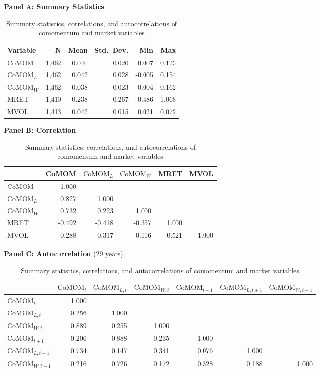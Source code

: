 \begin{table}[htbp]
\centering
\caption{Summary statistics, correlations, and autocorrelations of comomentum and market variables}
\label{tab:summary_statistics}
\small

\textbf{Panel A: Summary Statistics}\\[4pt]
\begin{tabular}{l r r r r r}
\toprule
    Variable & N & Mean & Std.\ Dev. & Min & Max \\
\midrule
    CoMOM & 1,462 & 0.040 & 0.020 & 0.007 & 0.123 \\
    $\text{CoMOM}_{L}$ & 1,462 & 0.042 & 0.028 & -0.005 & 0.154 \\
    $\text{CoMOM}_{W}$ & 1,462 & 0.038 & 0.023 & 0.004 & 0.162 \\
    MRET & 1,410 & 0.238 & 0.267 & -0.486 & 1.068 \\
    MVOL & 1,413 & 0.042 & 0.015 & 0.021 & 0.072 \\
\bottomrule
\end{tabular}
\vspace{12pt}

\textbf{Panel B: Correlation}\\[4pt]
\begin{tabular}{l r r r r r}
\toprule
     & CoMOM & $\text{CoMOM}_{L}$ & $\text{CoMOM}_{W}$ & MRET & MVOL \\
\midrule
    CoMOM & 1.000 &  &  &  &  \\
    $\text{CoMOM}_{L}$ & 0.827 & 1.000 &  &  &  \\
    $\text{CoMOM}_{W}$ & 0.732 & 0.223 & 1.000 &  &  \\
    MRET & -0.492 & -0.418 & -0.357 & 1.000 &  \\
    MVOL & 0.288 & 0.317 & 0.116 & -0.521 & 1.000 \\
\bottomrule
\end{tabular}
\vspace{12pt}

\textbf{Panel C: Autocorrelation} (29 years)\\[4pt]
\begin{tabular}{l r r r r r r}
\toprule
     & $\text{CoMOM}_{t}$ & $\text{CoMOM}_{L,t}$ & $\text{CoMOM}_{W,t}$ & $\text{CoMOM}_{t+1}$ & $\text{CoMOM}_{L,t+1}$ & $\text{CoMOM}_{W,t+1}$ \\
\midrule
    $\text{CoMOM}_{t}$ & 1.000 &  &  &  &  &  \\
    $\text{CoMOM}_{L,t}$ & 0.256 & 1.000 &  &  &  &  \\
    $\text{CoMOM}_{W,t}$ & 0.889 & 0.255 & 1.000 &  &  &  \\
    $\text{CoMOM}_{t+1}$ & 0.206 & 0.888 & 0.235 & 1.000 &  &  \\
    $\text{CoMOM}_{L,t+1}$ & 0.734 & 0.147 & 0.341 & 0.076 & 1.000 &  \\
    $\text{CoMOM}_{W,t+1}$ & 0.216 & 0.726 & 0.172 & 0.328 & 0.188 & 1.000 \\
\bottomrule
\end{tabular}

\end{table}

